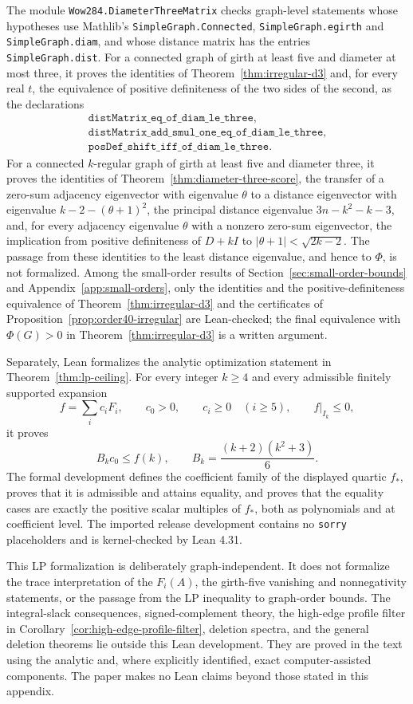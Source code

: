 \documentclass[a4paper,10pt,reqno]{amsart}
\theoremstyle{plain}
\theoremstyle{definition}
\theoremstyle{remark}
\begin{document}
The module \texttt{Wow284.DiameterThreeMatrix} checks graph-level statements
whose hypotheses use Mathlib's \texttt{SimpleGraph.Connected},
\texttt{SimpleGraph.egirth} and \texttt{SimpleGraph.diam}, and whose distance
matrix has the entries \texttt{SimpleGraph.dist}. For a connected graph of
girth at least five and diameter at most three, it proves the identities of
Theorem~\ref{thm:irregular-d3} and, for every real \(t\), the equivalence of
positive definiteness of the two sides of the second, as the declarations
\[
\begin{array}{l}
\texttt{distMatrix\_eq\_of\_diam\_le\_three},\\
\texttt{distMatrix\_add\_smul\_one\_eq\_of\_diam\_le\_three},\\
\texttt{posDef\_shift\_iff\_of\_diam\_le\_three}.
\end{array}
\]
For a connected \(k\)-regular graph of girth
at least five and diameter three, it proves the identities of
Theorem~\ref{thm:diameter-three-score}, the transfer of a zero-sum adjacency
eigenvector with eigenvalue \(\theta\) to a distance eigenvector with
eigenvalue \(k-2-(\theta+1)^2\), the principal distance eigenvalue
\(3n-k^2-k-3\), and, for every adjacency eigenvalue \(\theta\) with a nonzero
zero-sum eigenvector, the implication from positive definiteness of \(D+kI\)
to \(|\theta+1|<\sqrt{2k-2}\). The passage from these identities to the least
distance eigenvalue, and hence to \(\Phi\), is not formalized. Among the
small-order results of Section~\ref{sec:small-order-bounds} and
Appendix~\ref{app:small-orders}, only the identities and the
positive-definiteness equivalence of Theorem~\ref{thm:irregular-d3} and the
certificates of Proposition~\ref{prop:order40-irregular} are Lean-checked;
the final equivalence with \(\Phi(G)>0\) in Theorem~\ref{thm:irregular-d3}
is a written argument.

Separately, Lean formalizes the analytic optimization statement in
Theorem~\ref{thm:lp-ceiling}.  For every integer \(k\ge4\) and every admissible
finitely supported expansion
\[
  f=\sum_i c_iF_i,
  \qquad c_0>0,
  \qquad c_i\ge0\quad(i\ge5),
  \qquad f\vert_{I_k}\le0,
\]
it proves
\[
  B_kc_0\le f(k),
  \qquad B_k=\frac{(k+2)(k^2+3)}6.
\]
The formal development defines the coefficient family of the displayed
quartic \(f_*\), proves that it is admissible and attains equality, and proves
that the equality cases are exactly the positive scalar multiples of \(f_*\),
both as polynomials and at coefficient level.  The imported release
development contains no \texttt{sorry} placeholders and is kernel-checked by
Lean 4.31.

This LP formalization is deliberately graph-independent.  It does not
formalize the trace interpretation of the \(F_i(A)\), the girth-five
vanishing and nonnegativity statements, or the passage from the LP inequality
to graph-order bounds.  The integral-slack consequences, signed-complement
theory, the high-edge profile filter in
Corollary~\ref{cor:high-edge-profile-filter}, deletion spectra, and the
general deletion theorems lie outside this Lean
development.  They are proved in the text using the analytic and, where
explicitly identified, exact computer-assisted components.  The paper makes
no Lean claims beyond those stated in this appendix.
\end{document}
